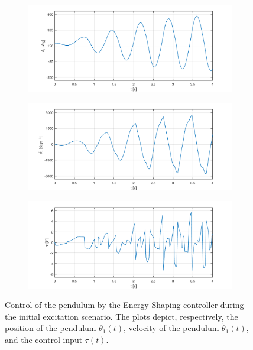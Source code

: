 \begin{figure}[H]
	\centering
	\begin{subfigure}
		\centering
		\includegraphics[scale=0.6]{images/swings/pend.pdf}  
	\end{subfigure}
	\begin{subfigure}
		\centering
		\includegraphics[scale=0.6]{images/swings/dpend.pdf}  
	\end{subfigure}
	\begin{subfigure}
		\centering
		\includegraphics[scale=0.6]{images/swings/control.pdf}  
	\end{subfigure}
	\caption{Control of the pendulum by the Energy-Shaping controller during the initial excitation scenario. The plots depict, respectively, the position of the pendulum $\theta_1(t)$, velocity of the pendulum $\dot{\theta}_1(t)$, and the control input $\tau(t)$.}
	\label{swing1}
\end{figure}
